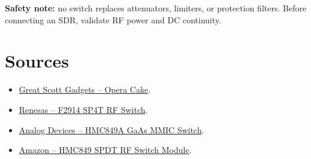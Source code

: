 \documentclass[11pt]{article}
\begin{document}
\begin{warningbox}
\textbf{Safety note:} no switch replaces attenuators, limiters, or protection filters. Before connecting an SDR, validate RF power and DC continuity.
\end{warningbox}

\section{Sources}

\begin{itemize}
    \item \href{https://greatscottgadgets.com/hackrf/operacake/}{Great Scott Gadgets -- Opera Cake}.
    \item \href{https://www.renesas.com/en/products/rf-products/rf-switches/f2914-high-reliability-sp4t-rf-switch}{Renesas -- F2914 SP4T RF Switch}.
    \item \href{https://www.analog.com/en/products/hmc849.html}{Analog Devices -- HMC849A GaAs MMIC Switch}.
    \item \href{https://www.amazon.com/Switch-Module-Single-Impedance-Reliability/dp/B0BXVVLGFB}{Amazon -- HMC849 SPDT RF Switch Module}.
\end{itemize}
\end{document}
